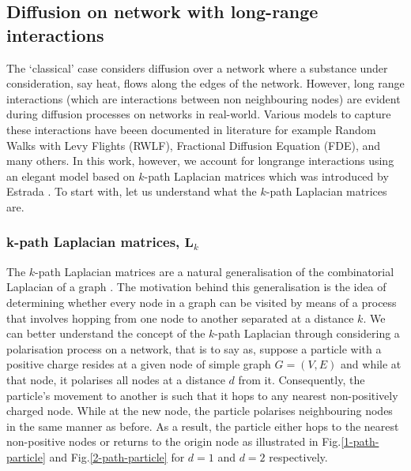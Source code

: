 \documentclass[10pt,a4paper]{article}
\theoremstyle{plain}
\theoremstyle{definition}
\begin{document}
    \subsection{Diffusion on network with long-range interactions}
    The `classical' case considers diffusion over a network where a substance under consideration, say heat, flows along the edges of the network. However, long range interactions (which are interactions between non neighbouring nodes) are evident during diffusion processes on networks in real-world. Various models to capture these interactions have beeen documented in literature for example Random Walks with Levy Flights (RWLF), Fractional Diffusion Equation (FDE), and many others. In this work, however, we account for longrange interactions using an elegant model based on $k$-path Laplacian matrices which was introduced by Estrada \citep{estrada2017path}. To start with, let us understand what the $k$-path Laplacian matrices are.
    	    \subsubsection{ k-path Laplacian matrices, $\mathbf{L}_k$}
    	    The $k$-path Laplacian matrices are a natural generalisation of the combinatorial Laplacian of a graph \citep{estrada2012path}. The motivation behind this generalisation is the idea of determining whether every node in a graph can be visited by means of a process that involves hopping from one node to another separated at a distance $k$. We can better understand the concept of the $k$-path Laplacian through considering a polarisation process on a network, that is to say as, suppose a particle with a positive charge resides at a given node of simple graph $G= (V,E)$ and while at that node, it polarises all nodes at a distance $d$ from it. Consequently, the particle's movement to another is such that it hops to any nearest non-positively charged node. While at the new node, the particle polarises neighbouring nodes in the same manner as before. As a result, the particle either hops to the nearest non-positive nodes or returns to the origin node as illustrated in Fig.\ref{1-path-particle} and Fig.\ref{2-path-particle} for $d=1$ and $d=2$ respectively.
    	    
\end{document}
